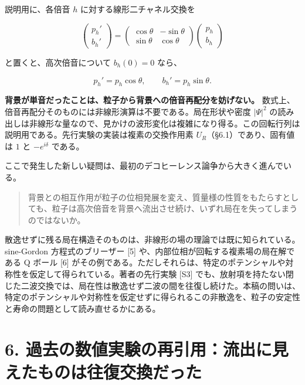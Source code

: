 \documentclass[
  a4paper,
]{ltjsarticle}
\begin{document}
説明用に、各倍音 \(h\) に対する線形二チャネル交換を

\[
\begin{pmatrix}p_h'\\b_h'\end{pmatrix}
=
\begin{pmatrix}
\cos\theta&-\sin\theta\\
\sin\theta&\cos\theta
\end{pmatrix}
\begin{pmatrix}p_h\\b_h\end{pmatrix}
\]

と置くと、高次倍音について \(b_h(0)=0\) なら、

\[
p_h' =p_h\cos\theta,\qquad
b_h'=p_h\sin\theta.
\]

\textbf{背景が単音だったことは、粒子から背景への倍音再配分を妨げない。}
数式上、倍音再配分そのものには非線形演算は不要である。局在形状や密度
\(|\Psi|^2\)
の読み出しは非線形な量なので、見かけの波形変化は複雑になり得る。この回転行列は説明用である。先行実験の実装は複素の交換作用素
\(U_R\)（§6.1）であり、固有値は \(1\) と \(-e^{i\delta}\) である。

ここで発生した新しい疑問は、最初のデコヒーレンス論争から大きく進んでいる。

\begin{quote}
背景との相互作用が粒子の位相発展を変え、質量様の性質をもたらすとしても、粒子は高次倍音を背景へ流出させ続け、いずれ局在を失ってしまうのではないか。
\end{quote}

散逸せずに残る局在構造そのものは、非線形の場の理論では既に知られている。sine-Gordon
方程式のブリーザー {[}5{]} や、内部位相が回転する複素場の局在解である Q
ボール {[}6{]}
がその例である。ただしそれらは、特定のポテンシャルや対称性を仮定して得られている。著者の先行実験
{[}S3{]}
でも、放射項を持たない閉じた二波交換では、局在性は散逸せず二波の間を往復し続けた。本稿の問いは、特定のポテンシャルや対称性を仮定せずに得られるこの非散逸を、粒子の安定性と寿命の問題として読み直せるかにある。

\section{6.
過去の数値実験の再引用：流出に見えたものは往復交換だった}\label{ux904eux53bbux306eux6570ux5024ux5b9fux9a13ux306eux518dux5f15ux7528ux6d41ux51faux306bux898bux3048ux305fux3082ux306eux306fux5f80ux5fa9ux4ea4ux63dbux3060ux3063ux305f}
\end{document}
